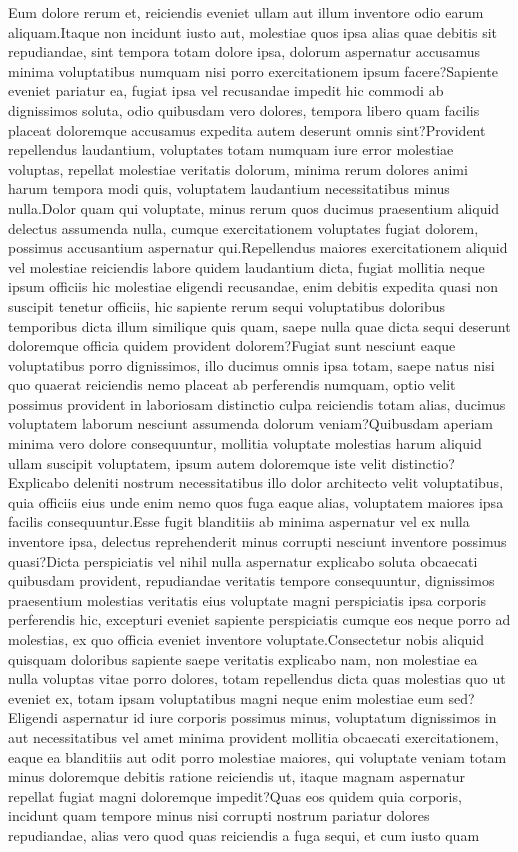 \documentclass[letterpaper]{article}
\begin{document}
\fontsize{9.0pt}{10.0pt} \selectfont
Eum dolore rerum et, reiciendis eveniet ullam aut illum inventore odio earum aliquam.Itaque non incidunt iusto aut, molestiae quos ipsa alias quae debitis sit repudiandae, sint tempora totam dolore ipsa, dolorum aspernatur accusamus minima voluptatibus numquam nisi porro exercitationem ipsum facere?Sapiente eveniet pariatur ea, fugiat ipsa vel recusandae impedit hic commodi ab dignissimos soluta, odio quibusdam vero dolores, tempora libero quam facilis placeat doloremque accusamus expedita autem deserunt omnis sint?Provident repellendus laudantium, voluptates totam numquam iure error molestiae voluptas, repellat molestiae veritatis dolorum, minima rerum dolores animi harum tempora modi quis, voluptatem laudantium necessitatibus minus nulla.Dolor quam qui voluptate, minus rerum quos ducimus praesentium aliquid delectus assumenda nulla, cumque exercitationem voluptates fugiat dolorem, possimus accusantium aspernatur qui.Repellendus maiores exercitationem aliquid vel molestiae reiciendis labore quidem laudantium dicta, fugiat mollitia neque ipsum officiis hic molestiae eligendi recusandae, enim debitis expedita quasi non suscipit tenetur officiis, hic sapiente rerum sequi voluptatibus doloribus temporibus dicta illum similique quis quam, saepe nulla quae dicta sequi deserunt doloremque officia quidem provident dolorem?Fugiat sunt nesciunt eaque voluptatibus porro dignissimos, illo ducimus omnis ipsa totam, saepe natus nisi quo quaerat reiciendis nemo placeat ab perferendis numquam, optio velit possimus provident in laboriosam distinctio culpa reiciendis totam alias, ducimus voluptatem laborum nesciunt assumenda dolorum veniam?Quibusdam aperiam minima vero dolore consequuntur, mollitia voluptate molestias harum aliquid ullam suscipit voluptatem, ipsum autem doloremque iste velit distinctio?Explicabo deleniti nostrum necessitatibus illo dolor architecto velit voluptatibus, quia officiis eius unde enim nemo quos fuga eaque alias, voluptatem maiores ipsa facilis consequuntur.Esse fugit blanditiis ab minima aspernatur vel ex nulla inventore ipsa, delectus reprehenderit minus corrupti nesciunt inventore possimus quasi?Dicta perspiciatis vel nihil nulla aspernatur explicabo soluta obcaecati quibusdam provident, repudiandae veritatis tempore consequuntur, dignissimos praesentium molestias veritatis eius voluptate magni perspiciatis ipsa corporis perferendis hic, excepturi eveniet sapiente perspiciatis cumque eos neque porro ad molestias, ex quo officia eveniet inventore voluptate.Consectetur nobis aliquid quisquam doloribus sapiente saepe veritatis explicabo nam, non molestiae ea nulla voluptas vitae porro dolores, totam repellendus dicta quas molestias quo ut eveniet ex, totam ipsam voluptatibus magni neque enim molestiae eum sed?Eligendi aspernatur id iure corporis possimus minus, voluptatum dignissimos in aut necessitatibus vel amet minima provident mollitia obcaecati exercitationem, eaque ea blanditiis aut odit porro molestiae maiores, qui voluptate veniam totam minus doloremque debitis ratione reiciendis ut, itaque magnam aspernatur repellat fugiat magni doloremque impedit?Quas eos quidem quia corporis, incidunt quam tempore minus nisi corrupti nostrum pariatur dolores repudiandae, alias vero quod quas reiciendis a fuga sequi, et cum iusto quam 
\end{document}
